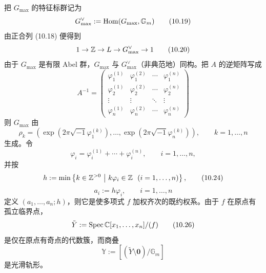 把 $G_{\max}$ 的特征标群记为
\begin{equation}
    G^{\vee}_{\max}:=\operatorname{Hom}(G_{\max},\mathbb{G}_m) \tag{10.19}
\end{equation}
由正合列 (10.18) 便得到
\begin{equation}
    1\to\mathbb{Z}\to L\to G^{\vee}_{\max}\to 1 \tag{10.20}
\end{equation}
由于 $G_{\max}$ 是有限 Abel 群，$G_{\max}$ 与 $G^{\vee}_{\max}$（非典范地）同构。把 $A$ 的逆矩阵写成
\begin{equation}
    A^{-1}=
    \begin{pmatrix}
        \varphi_1^{(1)} & \varphi_1^{(2)} & \cdots & \varphi_1^{(n)} \\
        \varphi_2^{(1)} & \varphi_2^{(2)} & \cdots & \varphi_2^{(n)} \\
        \vdots & \vdots & \ddots & \vdots \\
        \varphi_n^{(1)} & \varphi_n^{(2)} & \cdots & \varphi_n^{(n)}
    \end{pmatrix} \tag{10.21}
\end{equation}
则 $G_{\max}$ 由
\begin{equation}
    \rho_k=\left(\exp\left(2\pi\sqrt{-1}\varphi_1^{(k)}\right),\ldots,\exp\left(2\pi\sqrt{-1}\varphi_n^{(k)}\right)\right),\qquad k=1,\ldots,n \tag{10.22}
\end{equation}
生成。令
\begin{equation}
    \varphi_i=\varphi_i^{(1)}+\cdots+\varphi_i^{(n)},\qquad i=1,\ldots,n, \tag{10.23}
\end{equation}
并按
\begin{equation}
    h:=\min\left\{k\in\Z^{>0}\ \middle|\ k\varphi_i\in\Z\ \ (i=1,\ldots,n)\right\}, \tag{10.24}
\end{equation}
\begin{equation}
    a_i:=h\varphi_i,\qquad i=1,\ldots,n \tag{10.25}
\end{equation}
定义 $(a_1,\ldots,a_n;h)$，则它是使多项式 $f$ 加权齐次的既约权系。由于 $f$ 在原点有孤立临界点，
\begin{equation}
    \tilde Y:=\operatorname{Spec}\mathbb{C}[x_1,\ldots,x_n]/(f) \tag{10.26}
\end{equation}
是仅在原点有奇点的代数簇，而商叠
\begin{equation}
    \mathbb{Y}:=\left[\left(\tilde Y\setminus\mathbf{0}\right)/\mathbb{G}_m\right] \tag{10.27}
\end{equation}
是光滑轨形。

